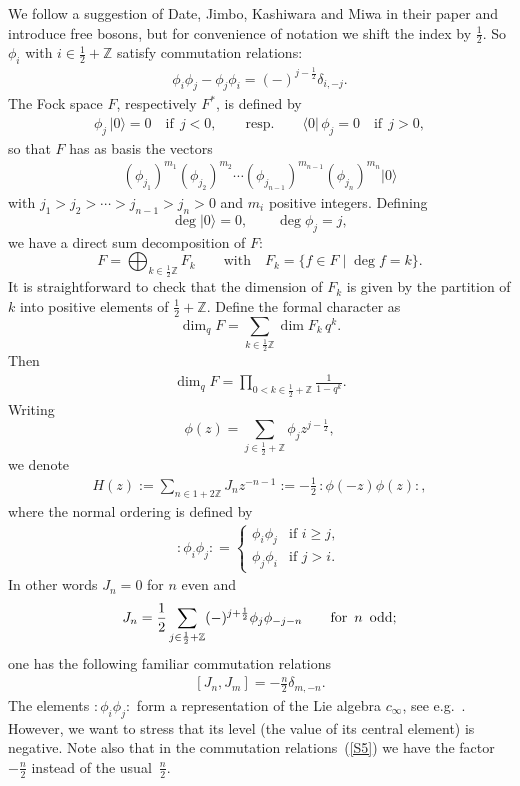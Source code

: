 \documentclass[pdftex]{sigma}
\numberwithin{equation}{section}
\newcommand{\INZ}[2]{\in\frac#1#2 +\mathbb{Z}}
\begin{document}
We follow a suggestion of Date, Jimbo, Kashiwara and Miwa in their paper \cite{DJKMVI}
and introduce free bosons, but for convenience of notation we
shift the index by $\frac 12$. So
$\phi_i$ with $i\in\frac 12+\mathbb{Z}$ satisfy commutation relations:
\begin{gather}
\label{S1}
\phi_{i}\phi_j-\phi_j\phi_i=(-)^{j-\frac{1}{2}}\delta_{i,-j}.
\end{gather}
The Fock space $F$, respectively $F^*$, is def\/ined
by
\begin{gather}
\label{S2} \phi_j\, |0\rangle=0\quad\mbox{if}\ \ j<0,\qquad\mbox{resp.}\qquad
\langle 0|\, \phi_j=0\quad\mbox{if}\ \ j>0,
\end{gather}
so that $F$ has as basis the vectors
 \begin{gather}\label{S2BASIS}
(\phi_{j_1})^{m_1}(\phi_{j_{2}})^{m_{2}}
\cdots(\phi_{j_{n-1}})^{m_{n-1}}(\phi_{j_n})^{m_n}|0\rangle
 \end{gather}
with $j_1>j_2>\cdots> j_{n-1}>j_n>0$ and $m_i$ positive integers.
Def\/ining
\[
\deg |0\rangle =0 ,\qquad\deg\phi_j=j ,
\]
we have a direct sum decomposition of $F$:
\[
F=\bigoplus_{k\in\frac12\mathbb Z} F_k\qquad\mbox{with}\quad
F_k=\{f\in F\mid \deg f=k\} .
\]
It is straightforward to check that the dimension of $F_k$ is
given by the partition of $k$ into
 positive elements of $\frac 12+\mathbb{Z}$.
Def\/ine the formal character as
\[
\dim_q F=\sum_{k\in\frac12\mathbb Z} \dim F_k\, q^k .
\]
Then
\begin{gather}\label{q1}
\dim_q F=\prod_{0<k\INZ12}\frac 1{1-q^k} .
\end{gather}
Writing
\[
\phi(z)=\sum_{j\INZ12}\phi_jz^{j-\frac 12} ,
\]
we denote
\begin{gather}
\label{S4} H(z):=\sum_{n\in
1+2\mathbb{Z}}J_nz^{-n-1}:=-\frac 12\,{:}\phi(-z)\phi(z){:} ,
\end{gather}
where the normal ordering is def\/ined by
\begin{gather}\label{normal ordering}
{:}\phi_i\phi_j{:}=
\begin{cases}
\phi_i\phi_j&\mbox{if }i\ge j ,\\[2pt]
\phi_j\phi_i&\mbox{if }j>i .
\end{cases}
\end{gather}
In other words  $J_n=0$ for $n$ even and
\[ %
J_n=\frac{1}{2}\sum_{j\in
\frac{1}{2}+\mathbb{Z}}(-)^{j+\frac{1}{2}}\phi_j\phi_{-j-n}\qquad
\mbox{for\,\ $n$\,\ odd;}
\] %
one has the following familiar commutation relations
\begin{gather}
\label{S5} [J_n, J_m]=-\frac{n}{2}\delta_{m,-n} .
\end{gather}
The elements ${:}\phi_i\phi_j{:}$ form a representation of the
Lie algebra $c_\infty$, see e.g.~\cite{Kac-Leur}. However,
we want to stress that its level (the value of its central element) is negative.
Note also that in the commutation relations~(\ref{S5}) we
have the factor $-\frac{n}{2}$ instead of the usual~$\frac{n}{2}$.
\end{document}
